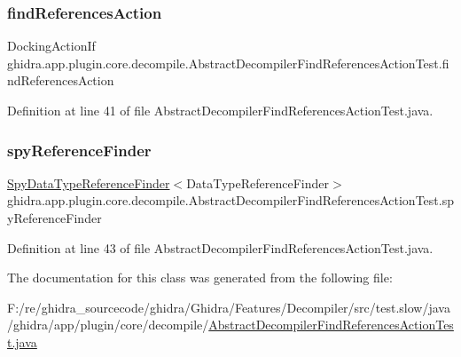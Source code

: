 \subsubsection{\texorpdfstring{findReferencesAction}{findReferencesAction}}
{\footnotesize\ttfamily Docking\+Action\+If ghidra.\+app.\+plugin.\+core.\+decompile.\+Abstract\+Decompiler\+Find\+References\+Action\+Test.\+find\+References\+Action\hspace{0.3cm}{\ttfamily [protected]}}



Definition at line 41 of file Abstract\+Decompiler\+Find\+References\+Action\+Test.\+java.

\mbox{\label{classghidra_1_1app_1_1plugin_1_1core_1_1decompile_1_1_abstract_decompiler_find_references_action_test_a7fff498f5aae4fdd9104442ddc904ce5}} 
\subsubsection{\texorpdfstring{spyReferenceFinder}{spyReferenceFinder}}
{\footnotesize\ttfamily \mbox{\hyperlink{classghidra_1_1app_1_1plugin_1_1core_1_1decompile_1_1_abstract_decompiler_find_references_action62f1da74789936d35e783df474af1e76}{Spy\+Data\+Type\+Reference\+Finder}}$<$Data\+Type\+Reference\+Finder$>$ ghidra.\+app.\+plugin.\+core.\+decompile.\+Abstract\+Decompiler\+Find\+References\+Action\+Test.\+spy\+Reference\+Finder\hspace{0.3cm}{\ttfamily [protected]}}



Definition at line 43 of file Abstract\+Decompiler\+Find\+References\+Action\+Test.\+java.



The documentation for this class was generated from the following file\+:\begin{DoxyCompactItemize}
\item 
F\+:/re/ghidra\+\_\+sourcecode/ghidra/\+Ghidra/\+Features/\+Decompiler/src/test.\+slow/java/ghidra/app/plugin/core/decompile/\mbox{\hyperlink{_abstract_decompiler_find_references_action_test_8java}{Abstract\+Decompiler\+Find\+References\+Action\+Test.\+java}}\end{DoxyCompactItemize}
